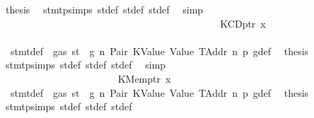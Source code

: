 \begin{isabellebody}
\ {\isacharquery}{\kern0pt}thesis\ \isamarkupfalse%
\ stmt{\isachardot}{\kern0pt}psimps{\isacharparenleft}{\kern0pt}{}{\isacharparenright}{\kern0pt}\ st{\isacharprime}{\kern0pt}{\isacharunderscore}{\kern0pt}def\ st{\isacharprime}{\kern0pt}{\isacharprime}{\kern0pt}{\isacharunderscore}{\kern0pt}def\ st{\isacharprime}{\kern0pt}{\isacharprime}{\kern0pt}{\isacharprime}{\kern0pt}{\isacharunderscore}{\kern0pt}def\ \isamarkupfalse%
\ simp\isanewline
\ \ \ \ \ \ \ \ \ \ \ \ \ \ \ \ \ \ \ \ \ \ \isamarkupfalse%
\isanewline
\ \ \ \ \ \ \ \ \ \ \ \ \ \ \ \ \ \ \ \ \isamarkupfalse%
\isanewline
\ \ \ \ \ \ \ \ \ \ \ \ \ \ \ \ \ \ \ \ \ \ \isamarkupfalse%
\ {\isacharparenleft}{\kern0pt}KCDptr\ x{}{\isacharparenright}{\kern0pt}\isanewline
\ \ \ \ \ \ \ \ \ \ \ \ \ \ \ \ \ \ \ \ \ \ \isamarkupfalse%
\ {}{\isacharparenleft}{\kern0pt}{}{\isacharparenright}{\kern0pt}\ stmt{\isacharunderscore}{\kern0pt}def\ {\isacharbackquoteopen}{\isasymnot}\ gas\ st\ {\isasymle}\ g{\isacharbackquoteclose}\ n\ Pair\ KValue\ Value\ TAddr\ n{}\ p{}\ g{\isacharunderscore}{\kern0pt}def\ \isamarkupfalse%
\ {\isacharquery}{\kern0pt}thesis\ \isamarkupfalse%
\ stmt{\isachardot}{\kern0pt}psimps{\isacharparenleft}{\kern0pt}{}{\isacharparenright}{\kern0pt}\ st{\isacharprime}{\kern0pt}{\isacharunderscore}{\kern0pt}def\ st{\isacharprime}{\kern0pt}{\isacharprime}{\kern0pt}{\isacharunderscore}{\kern0pt}def\ st{\isacharprime}{\kern0pt}{\isacharprime}{\kern0pt}{\isacharprime}{\kern0pt}{\isacharunderscore}{\kern0pt}def\ \isamarkupfalse%
\ simp\isanewline
\ \ \ \ \ \ \ \ \ \ \ \ \ \ \ \ \ \ \ \ \isamarkupfalse%
\isanewline
\ \ \ \ \ \ \ \ \ \ \ \ \ \ \ \ \ \ \ \ \ \ \isamarkupfalse%
\ {\isacharparenleft}{\kern0pt}KMemptr\ x{}{\isacharparenright}{\kern0pt}\isanewline
\ \ \ \ \ \ \ \ \ \ \ \ \ \ \ \ \ \ \ \ \ \ \isamarkupfalse%
\ {}{\isacharparenleft}{\kern0pt}{}{\isacharparenright}{\kern0pt}\ stmt{\isacharunderscore}{\kern0pt}def\ {\isacharbackquoteopen}{\isasymnot}\ gas\ st\ {\isasymle}\ g{\isacharbackquoteclose}\ n\ Pair\ KValue\ Value\ TAddr\ n{}\ p{}\ g{\isacharunderscore}{\kern0pt}def\ \isamarkupfalse%
\ {\isacharquery}{\kern0pt}thesis\ \isamarkupfalse%
\ stmt{\isachardot}{\kern0pt}psimps{\isacharparenleft}{\kern0pt}{}{\isacharparenright}{\kern0pt}\ st{\isacharprime}{\kern0pt}{\isacharunderscore}{\kern0pt}def\ st{\isacharprime}{\kern0pt}{\isacharprime}{\kern0pt}{\isacharunderscore}{\kern0pt}def\ st{\isacharprime}{\kern0pt}{\isacharprime}{\kern0pt}{\isacharprime}{\kern0pt}{\isacharunderscore}{\kern0pt}def\ \isamarkupfalse%

\end{isabellebody}
